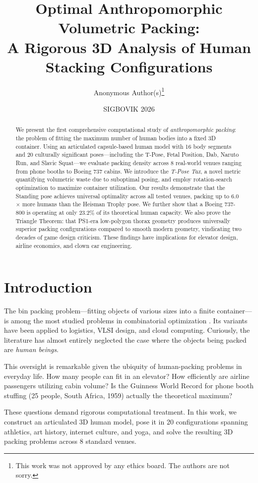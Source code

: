 \documentclass[11pt,letterpaper]{article}
\title{\textbf{Optimal Anthropomorphic Volumetric Packing:\\A Rigorous 3D Analysis of Human Stacking Configurations}}
\author{
  Anonymous Author(s)\thanks{This work was not approved by any ethics board. The authors are not sorry.}
}
\date{SIGBOVIK 2026}
\begin{document}
\maketitle

\begin{abstract}
We present the first comprehensive computational study of \emph{anthropomorphic packing}: the problem of fitting the maximum number of human bodies into a fixed 3D container. Using an articulated capsule-based human model with 16 body segments and 20 culturally significant poses---including the T-Pose, Fetal Position, Dab, Naruto Run, and Slavic Squat---we evaluate packing density across 8 real-world venues ranging from phone booths to Boeing 737 cabins. We introduce the \emph{T-Pose Tax}, a novel metric quantifying volumetric waste due to suboptimal posing, and employ rotation-search optimization to maximize container utilization. Our results demonstrate that the Standing pose achieves universal optimality across all tested venues, packing up to 6.0$\times$ more humans than the Heisman Trophy pose. We further show that a Boeing 737-800 is operating at only 23.2\% of its theoretical human capacity. We also prove the Triangle Theorem: that PS1-era low-polygon thorax geometry produces universally superior packing configurations compared to smooth modern geometry, vindicating two decades of game design criticism. These findings have implications for elevator design, airline economics, and clown car engineering.
\end{abstract}

\section{Introduction}

The bin packing problem---fitting objects of various sizes into a finite container---is among the most studied problems in combinatorial optimization \cite{garey1979}. Its variants have been applied to logistics, VLSI design, and cloud computing. Curiously, the literature has almost entirely neglected the case where the objects being packed are \emph{human beings}.

This oversight is remarkable given the ubiquity of human-packing problems in everyday life. How many people can fit in an elevator? How efficiently are airline passengers utilizing cabin volume? Is the Guinness World Record for phone booth stuffing (25 people, South Africa, 1959) actually the theoretical maximum?

These questions demand rigorous computational treatment. In this work, we construct an articulated 3D human model, pose it in 20 configurations spanning athletics, art history, internet culture, and yoga, and solve the resulting 3D packing problems across 8 standard venues.
\end{document}
